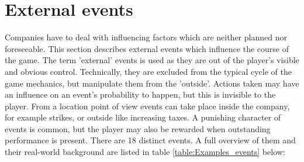 \documentclass[11pt,titlepage,oneside,openany]{book}
\begin{document}
\section{External events}
\label{sec:ectEvent}
Companies have to deal with influencing factors which are neither planned nor foreseeable. \cite{Campbell} This section describes external events which influence the course of the game. The term 'external' events is used as they are out of the player's visible and obvious control. Technically, they are excluded from the typical cycle of the game mechanics, but manipulate them from the 'outside'. Actions taken may have an influence on an event's probability to happen, but this is invisible to the player. From a location point of view events can take place inside the company, for example strikes, or outside like increasing taxes. A punishing character of events is common, but the player may also be rewarded when outstanding performance is present. There are 18 distinct events. A full overview of them and their real-world background are listed in table \ref{table:Examples_events} below: \\ 
\end{document}
